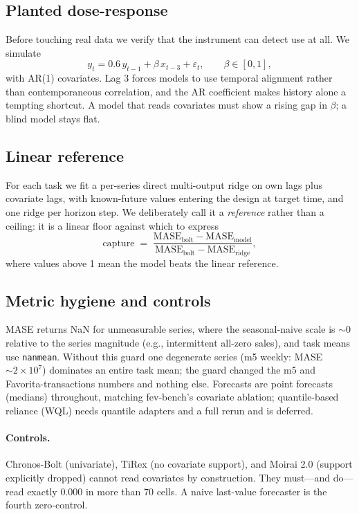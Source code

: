 \documentclass[letterpaper]{article}
\begin{document}
\subsection{Planted dose-response}\label{sec:planted}
Before touching real data we verify that the instrument can detect use at all. We
simulate
\begin{equation}
y_t = 0.6\,y_{t-1} + \beta\,x_{t-3} + \varepsilon_t, \qquad \beta \in [0, 1],
\end{equation}
with AR(1) covariates. Lag 3 forces models to use temporal alignment rather than
contemporaneous correlation, and the AR coefficient makes history alone a tempting
shortcut. A model that reads covariates must show a rising gap in $\beta$; a blind
model stays flat.

\subsection{Linear reference}
For each task we fit a per-series direct multi-output ridge on own lags plus covariate
lags, with known-future values entering the design at target time, and one ridge per
horizon step. We deliberately call it a \emph{reference} rather than a ceiling: it is
a linear floor against which to express
\begin{equation}
\mathrm{capture} \;=\; \frac{\mathrm{MASE}_{\text{bolt}} - \mathrm{MASE}_{\text{model}}}
{\mathrm{MASE}_{\text{bolt}} - \mathrm{MASE}_{\text{ridge}}} ,
\end{equation}
where values above 1 mean the model beats the linear reference.

\subsection{Metric hygiene and controls}
MASE returns NaN for unmeasurable series, where the seasonal-naive scale is
$\sim$0 relative to the series magnitude (e.g., intermittent all-zero sales), and task
means use \texttt{nanmean}. Without this guard one degenerate series (m5 weekly:
MASE $\sim 2\times 10^{7}$) dominates an entire task mean; the guard changed the m5
and Favorita-transactions numbers and nothing else. Forecasts are point forecasts
(medians) throughout, matching fev-bench's covariate ablation; quantile-based
reliance (WQL) needs quantile adapters and a full rerun and is deferred.

\paragraph{Controls.}
Chronos-Bolt (univariate), TiRex (no covariate support), and Moirai 2.0 (support
explicitly dropped) cannot read covariates by construction. They must---and do---read
exactly $0.000$ in more than 70 cells. A naive last-value forecaster is the fourth
zero-control.
\end{document}
